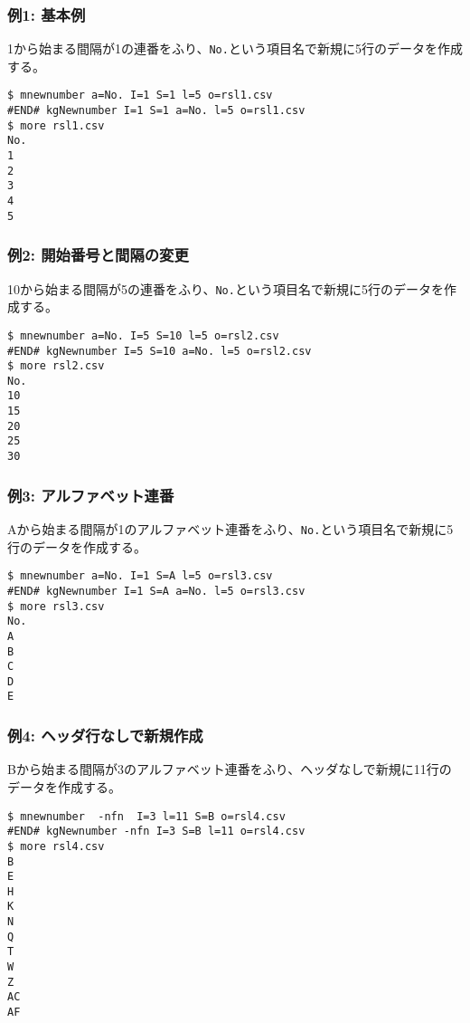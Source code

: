 \subsubsection*{例1: 基本例}

1から始まる間隔が1の連番をふり、\verb|No.|という項目名で新規に5行のデータを作成する。


\begin{Verbatim}[baselinestretch=0.7,frame=single]
$ mnewnumber a=No. I=1 S=1 l=5 o=rsl1.csv
#END# kgNewnumber I=1 S=1 a=No. l=5 o=rsl1.csv
$ more rsl1.csv
No.
1
2
3
4
5
\end{Verbatim}
\subsubsection*{例2: 開始番号と間隔の変更}

10から始まる間隔が5の連番をふり、\verb|No.|という項目名で新規に5行のデータを作成する。


\begin{Verbatim}[baselinestretch=0.7,frame=single]
$ mnewnumber a=No. I=5 S=10 l=5 o=rsl2.csv
#END# kgNewnumber I=5 S=10 a=No. l=5 o=rsl2.csv
$ more rsl2.csv
No.
10
15
20
25
30
\end{Verbatim}
\subsubsection*{例3: アルファベット連番}

Aから始まる間隔が1のアルファベット連番をふり、\verb|No.|という項目名で新規に5行のデータを作成する。


\begin{Verbatim}[baselinestretch=0.7,frame=single]
$ mnewnumber a=No. I=1 S=A l=5 o=rsl3.csv
#END# kgNewnumber I=1 S=A a=No. l=5 o=rsl3.csv
$ more rsl3.csv
No.
A
B
C
D
E
\end{Verbatim}
\subsubsection*{例4: ヘッダ行なしで新規作成}

Bから始まる間隔が3のアルファベット連番をふり、ヘッダなしで新規に11行のデータを作成する。


\begin{Verbatim}[baselinestretch=0.7,frame=single]
$ mnewnumber  -nfn  I=3 l=11 S=B o=rsl4.csv
#END# kgNewnumber -nfn I=3 S=B l=11 o=rsl4.csv
$ more rsl4.csv
B
E
H
K
N
Q
T
W
Z
AC
AF
\end{Verbatim}

